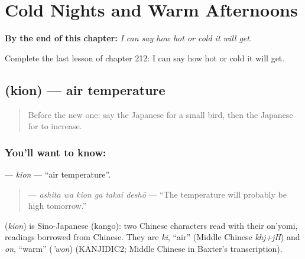 
\chapter{Cold Nights and Warm Afternoons}
\label{ch:ja-cold-nights-and-warm-afternoons}

\begin{chapteropening}
\textbf{By the end of this chapter:} \emph{I can say how hot or cold it will get.}

Complete the last lesson of chapter 212: I can say how hot or cold it will get.
\end{chapteropening}

\section[\texorpdfstring{\ja{きおん} (kion)}{きおん (kion)}]{ (kion) — air temperature}

\label{lesson:JA-C212-kion}



\begin{quote}
Before the new one: say the Japanese for a small bird, then the Japanese for to increase.
\end{quote}

\subsection*{You'll want to know: }
\textbf{} — \emph{kion} — \textquotedblleft{}air temperature\textquotedblright{}.

\begin{quote}
\textbf{  } — \emph{ashita wa kion ga takai deshō} — \textquotedblleft{}The temperature will probably be high tomorrow.\textquotedblright{}
\end{quote}

\begin{cousinweb}
\textbf{} (\emph{kion}) is Sino-Japanese (kango): two Chinese characters read with their on'yomi, readings borrowed from Chinese. They are \emph{ki}, \textquotedblleft{}air\textquotedblright{} (Middle Chinese \emph{khj+jH}) and \emph{on}, \textquotedblleft{}warm\textquotedblright{} (\emph{'won}) (KANJIDIC2; Middle Chinese in Baxter's transcription).
\end{cousinweb}

